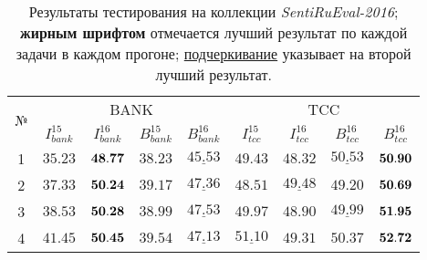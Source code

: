 \begin{table}[ht!]
\centering
\caption{Результаты тестирования на коллекции {\it SentiRuEval-2016};
        {\bf жирным шрифтом} отмечается лучший результат по каждой задачи
        в каждом прогоне;
        \underline{подчеркивание} указывает на второй лучший результат.
        }
\label{table:results2016}
\begin{tabular}{ccccccccc}
\hline
\multicolumn{1}{c|}{\multirow{2}{*}{№}} & \multicolumn{4}{c|}{BANK}                                                                                                                                 & \multicolumn{4}{c}{TCC}                                                                                                          \\ \cline{2-9}
\multicolumn{1}{c|}{}                   & \multicolumn{1}{c|}{$I_{bank}^{15}$} & \multicolumn{1}{c|}{$I_{bank}^{16}$} & \multicolumn{1}{c|}{$B_{bank}^{15}$} & \multicolumn{1}{c|}{$B_{bank}^{16}$} & \multicolumn{1}{c|}{$I_{tcc}^{15}$} & \multicolumn{1}{c|}{$I_{tcc}^{16}$} & \multicolumn{1}{c|}{$B_{tcc}^{16}$} & $B_{tcc}^{16}$ \\ \hline
1                                       & $35.23$                              & ${\bf 48.77}$                              & $38.23$                              & $\underline{45.53}$                              & $49.43$                             & $48.32$                             & $\underline{50.53}$                 & ${\bf 50.90}$        \\
2                                       & $37.33$                              & ${\bf 50.24}$                              & $39.17$                              & $\underline{47.36}$                              & $48.51$                             & $\underline{49.48}$                 & $49.20$                             & ${\bf 50.69}$        \\
3                                       & $38.53$                              & ${\bf 50.28}$                              & $38.99$                              & $\underline{47.53}$                              & $49.97$                             & $48.90$                             & $\underline{49.99}$                 & ${\bf 51.95}$        \\
4                                       & $41.45$                              & ${\bf 50.45}$                              & $39.54$                              & $\underline{47.13}$                              & $\underline{51.10}$                 & $49.31$                             & $50.37$                             & ${\bf 52.72}$        \\

\end{tabular}
\end{table}
